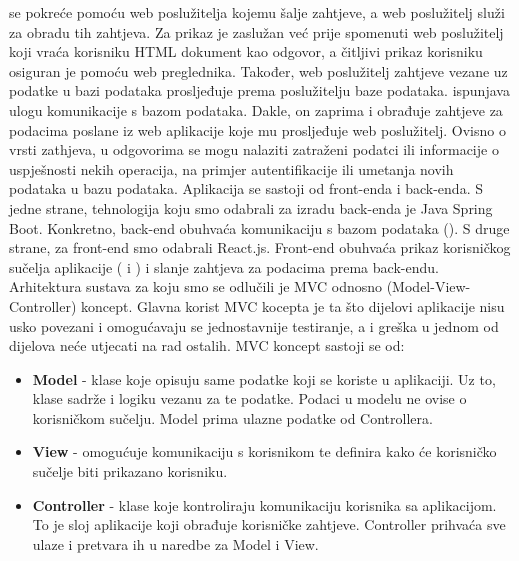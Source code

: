 	\indent {} se pokreće pomoću web poslužitelja kojemu šalje zahtjeve, a web poslužitelj služi za obradu tih zahtjeva. Za prikaz je zaslužan već prije spomenuti web poslužitelj koji vraća korisniku HTML dokument kao odgovor, a čitljivi prikaz korisniku osiguran je pomoću web preglednika. Također, web poslužitelj zahtjeve vezane uz podatke u bazi podataka prosljeđuje prema poslužitelju baze podataka. \newline
	\indent {} ispunjava ulogu komunikacije s bazom podataka. Dakle, on zaprima i obrađuje zahtjeve za podacima poslane iz web aplikacije koje mu prosljeđuje web poslužitelj. Ovisno o vrsti zathjeva, u odgovorima se mogu nalaziti zatraženi podatci ili informacije o uspješnosti nekih operacija, na primjer autentifikacije ili umetanja novih podataka u bazu podataka.\newline
	\indent Aplikacija se sastoji od front-enda i back-enda. S jedne strane, tehnologija koju smo odabrali za izradu back-enda je Java Spring Boot. Konkretno, back-end obuhvaća komunikaciju s bazom podataka (). S druge strane, za front-end smo odabrali React.js. Front-end obuhvaća prikaz korisničkog sučelja aplikacije ( i ) i slanje zahtjeva za podacima prema back-endu. Arhitektura sustava za koju smo se odlučili je MVC odnosno (Model-View-Controller) koncept. \newline
	\indent Glavna korist MVC kocepta je ta što dijelovi aplikacije nisu usko povezani i omogućavaju se jednostavnije testiranje, a i greška u jednom od dijelova neće utjecati na rad ostalih. \newline
	MVC koncept sastoji se od:
	\begin{itemize}
		\item   \textbf{Model} - klase koje opisuju same podatke koji se koriste u aplikaciji. Uz to, klase sadrže i logiku vezanu za te podatke. Podaci u modelu ne ovise o korisničkom sučelju. Model prima ulazne podatke od Controllera.
		\item 	\textbf{View} - omogućuje komunikaciju s korisnikom te definira kako će korisničko sučelje biti prikazano korisniku.
		\item 	\textbf{Controller}	- klase koje kontroliraju komunikaciju korisnika sa aplikacijom. To je sloj aplikacije koji obrađuje korisničke zahtjeve. Controller prihvaća sve ulaze i pretvara ih u naredbe za Model i View.   	
	\end{itemize}

